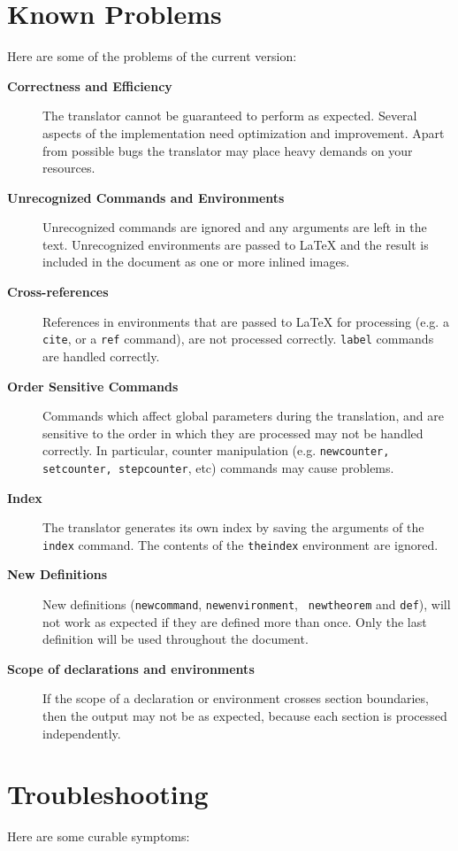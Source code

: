 \section{Known Problems}
 
Here are some of the problems of the current version:
\begin{description}
\item [{\bf Correctness and Efficiency} ]
The translator cannot be guaranteed to perform as expected.
Several aspects of the implementation need
optimization and improvement. Apart from possible bugs the translator 
may place heavy demands on your resources.
\item [{\bf Unrecognized Commands and Environments} ]
Unrecognized commands are ignored and any arguments are left in the
text. Unrecognized environments are passed to LaTeX  and the result is
included in the document as one or more inlined images.
\item [{\bf Cross-references}]
References in environments that are passed to LaTeX  for processing
(e.g. a {\tt cite}, or a {\tt ref} command), are not processed
correctly.
{\tt label} commands are handled correctly.
\item[{\bf Order Sensitive Commands}]
Commands which affect global parameters during the translation,
and are sensitive to the order in which they are processed may
not be handled correctly. In particular, counter manipulation
(e.g. {\tt newcounter, setcounter, stepcounter}, etc) 
commands may cause problems.
\item [{\bf Index}]
The translator generates its own index by saving the arguments  of 
the {\tt index} command. The contents of the {\tt theindex}
environment are ignored.
\item[{\bf New Definitions}]
New definitions ({\tt newcommand}, {\tt newenvironment}, {\tt
newtheorem} and {\tt def}),
will not work as expected if they are defined more than once.
Only the last definition will be used throughout the document.
\item [{\bf Scope of declarations and environments}]
If the scope of a declaration or environment crosses section
boundaries, then the output may not be as expected, because each
section is processed independently.
\end{description}

\section{Troubleshooting}
  
Here are some curable symptoms:


